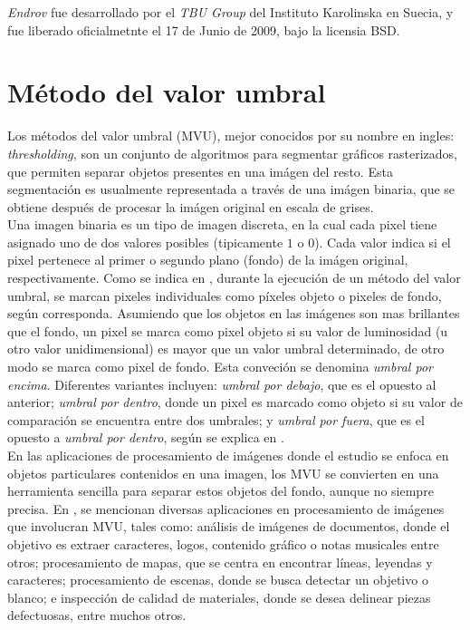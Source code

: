 \emph{Endrov} fue desarrollado por el \emph{TBU Group} del Instituto Karolinska en Suecia, y 
fue liberado oficialmetnte el 17 de Junio de 2009, bajo la licensia BSD.


\section{M\'etodo del valor umbral}
\label{sec:thresholding}

Los m\'etodos del valor umbral (MVU), mejor conocidos por su nombre en ingles: \emph{thresholding},
son un conjunto de algoritmos para segmentar gr\'aficos rasterizados, que permiten separar
objetos presentes en una im\'agen del resto. Esta segmentaci\'on es usualmente representada
a trav\'es de una im\'agen binaria, que se obtiene despu\'es de procesar la im\'agen original 
en escala de grises.\\

Una imagen binaria es un tipo de imagen discreta, en la cual cada pixel tiene asignado uno de
dos valores posibles (tipicamente $1$ o $0$). Cada valor indica si el pixel
pertenece al primer o segundo plano (fondo) de la im\'agen original, respectivamente.
Como se indica en \cite{web:thresholding}, durante la ejecuci\'on de un m\'etodo del valor
umbral, se marcan pixeles individuales como p\'ixeles objeto o pixeles de fondo, seg\'un
corresponda. Asumiendo que los objetos en las im\'agenes son mas brillantes que el fondo,
un pixel se marca como pixel objeto si su valor de luminosidad (u otro valor unidimensional) 
es mayor que un valor umbral determinado, de otro modo se marca como pixel de fondo.
Esta conveci\'on se denomina \emph{umbral por encima}. Diferentes variantes incluyen:
\emph{umbral por debajo}, que es el opuesto al anterior; \emph{umbral por dentro}, donde un
pixel es marcado como objeto si su valor de comparaci\'on se encuentra entre dos 
umbrales; y \emph{umbral por fuera}, que es el opuesto a \emph{umbral por dentro}, seg\'un
se explica en \cite{shapiro}.\\


En las aplicaciones de procesamiento de im\'agenes donde el estudio se enfoca en 
objetos particulares contenidos en una imagen, los MVU se convierten en una herramienta
sencilla para separar estos objetos del fondo, aunque no siempre precisa. En \cite[p.146]{thres},
se mencionan diversas aplicaciones en procesamiento de im\'agenes que involucran MVU, tales
como: an\'alisis de im\'agenes de documentos, donde el objetivo es extraer caracteres, logos,
contenido gr\'afico o notas musicales entre otros; procesamiento de mapas, que se centra en
encontrar l\'ineas, leyendas y caracteres; procesamiento de escenas, donde se busca detectar
un objetivo o blanco; e inspecci\'on de calidad de materiales, donde se desea delinear piezas
defectuosas, entre muchos otros.\\

